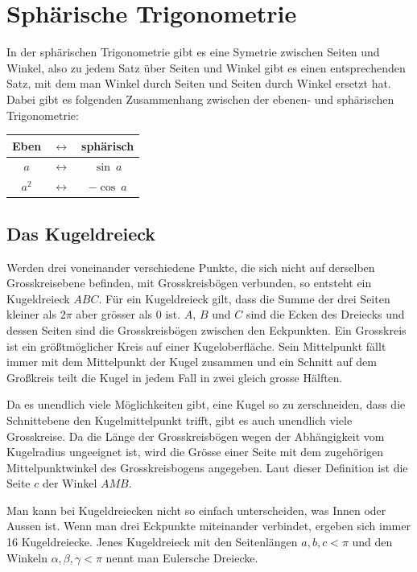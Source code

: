 
\section{Sphärische Trigonometrie}
In der sphärischen Trigonometrie gibt es eine Symetrie zwischen Seiten und Winkel, also zu jedem Satz über Seiten und Winkel gibt es einen entsprechenden Satz, mit dem man Winkel durch Seiten und Seiten durch Winkel ersetzt hat.
Dabei gibt es folgenden Zusammenhang zwischen der ebenen- und sphärischen Trigonometrie:
\begin{center}


\begin{tabular}{ccc}
	Eben & $\leftrightarrow$ & sphärisch \\
	\hline
	$a$ & $\leftrightarrow$  & $\sin \ a$  \\
	
	$a^2$ & $\leftrightarrow$  & $-\cos \ a$ \\
\end{tabular}
\end{center}

\subsection{Das Kugeldreieck}

Werden drei voneinander verschiedene Punkte, die sich nicht auf derselben Grosskreisebene befinden, mit Grosskreisbögen verbunden, so entsteht ein Kugeldreieck $ABC$.
Für ein Kugeldreieck gilt, dass die Summe der drei Seiten kleiner als $2\pi$ aber grösser als 0 ist.
$A$, $B$ und $C$ sind die Ecken des Dreiecks und dessen Seiten sind die Grosskreisbögen zwischen den Eckpunkten. 
Ein Grosskreis ist ein größtmöglicher Kreis auf einer Kugeloberfläche. 
Sein Mittelpunkt fällt immer mit dem Mittelpunkt der Kugel zusammen und ein Schnitt auf dem Großkreis teilt die Kugel in jedem Fall in zwei gleich grosse Hälften. 

Da es unendlich viele Möglichkeiten gibt, eine Kugel so zu zerschneiden, dass die Schnittebene den Kugelmittelpunkt trifft, gibt es auch unendlich viele Grosskreise.
Da die Länge der Grosskreisbögen wegen der Abhängigkeit vom Kugelradius ungeeignet ist, wird die Grösse einer Seite mit dem zugehörigen Mittelpunktwinkel des Grosskreisbogens angegeben. 
Laut dieser Definition ist die Seite $c$ der Winkel $AMB$. 

Man kann bei Kugeldreiecken nicht so einfach unterscheiden, was Innen oder Aussen ist. 
Wenn man drei Eckpunkte miteinander verbindet, ergeben sich immer 16 Kugeldreiecke. 
Jenes Kugeldreieck mit den Seitenlängen $a, b, c < \pi$ und den Winkeln $\alpha, \beta, \gamma < \pi$ nennt man Eulersche Dreiecke.

